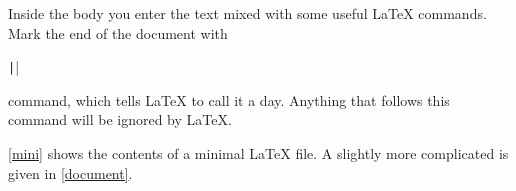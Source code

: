Inside the body you enter the text mixed with some useful \LaTeX{} commands.
Mark the end of the document with
\begin{code}
\texttt||
\end{code}
command, which tells \LaTeX{} to call it a day. Anything that
follows this command will be ignored by \LaTeX.

\autoref{mini} shows the contents of a minimal \LaTeX{} file. A
slightly more complicated  is given in
\autoref{document}.

\begin{listing}
  \begin{lined}{10cm}
  \end{lined}
  \caption{A Minimal \LaTeX{} File.}\label{mini}
\end{listing}

\begin{listing}
  \begin{lined}{\textwidth}
  \end{lined}
  \caption[Example of a realistic journal article.]{Example of a realistic
    journal article. Note that all the commands you see in this example will be
    explained later.}\label{document}
\end{listing}

